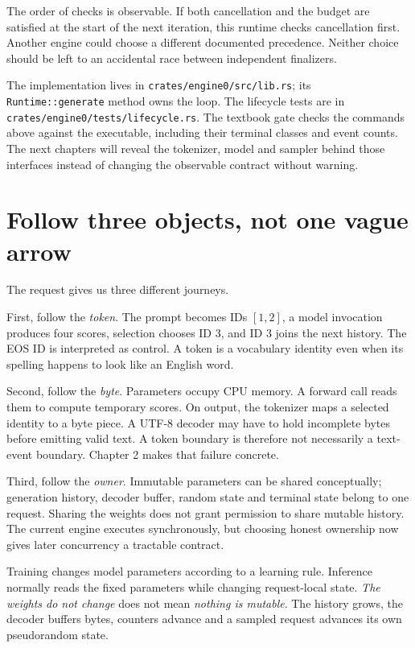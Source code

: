 The order of checks is observable. If both cancellation and the budget are
satisfied at the start of the next iteration, this runtime checks cancellation
first. Another engine could choose a different documented precedence. Neither
choice should be left to an accidental race between independent finalizers.

The implementation lives in \texttt{crates/engine0/src/lib.rs}; its
\texttt{Runtime::generate} method owns the loop. The lifecycle tests are in
\texttt{crates/engine0/tests/lifecycle.rs}. The textbook gate checks the commands
above against the executable, including their terminal classes and event counts.
The next chapters will reveal the tokenizer, model and sampler behind those
interfaces instead of changing the observable contract without warning.

\section{Follow three objects, not one vague arrow}
The request gives us three different journeys.

First, follow the \emph{token}. The prompt becomes IDs $[1,2]$, a model invocation
produces four scores, selection chooses ID 3, and ID 3 joins the next history.
The EOS ID is interpreted as control. A token is a vocabulary identity even
when its spelling happens to look like an English word.

Second, follow the \emph{byte}. Parameters occupy CPU memory. A forward call
reads them to compute temporary scores. On output, the tokenizer maps a
selected identity to a byte piece. A UTF-8 decoder may have to hold incomplete
bytes before emitting valid text. A token boundary is therefore not necessarily
a text-event boundary. Chapter 2 makes that failure concrete.

Third, follow the \emph{owner}. Immutable parameters can be shared conceptually;
generation history, decoder buffer, random state and terminal state belong to
one request. Sharing the weights does not grant permission to share mutable
history. The current engine executes synchronously, but choosing honest
ownership now gives later concurrency a tractable contract.


Training changes model parameters according to a learning rule. Inference
normally reads the fixed parameters while changing request-local state.
\emph{The weights do not change} does not mean \emph{nothing is mutable}. The
history grows, the decoder buffers bytes, counters advance and a sampled
request advances its own pseudorandom state.

